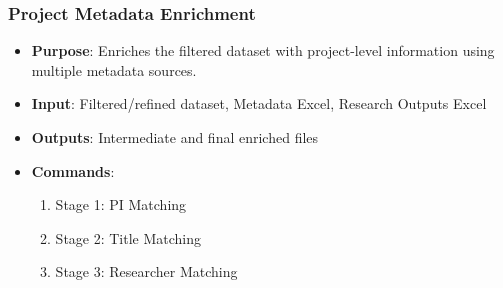 \documentclass[12pt]{article}
\begin{document}
\subsubsection{Project Metadata Enrichment}
\begin{itemize}
    \item \textbf{Purpose}: Enriches the filtered dataset with project-level information using multiple metadata sources.
    \item \textbf{Input}: Filtered/refined dataset, Metadata Excel, Research Outputs Excel
    \item \textbf{Outputs}: Intermediate and final enriched files
    \item \textbf{Commands}:
    \begin{enumerate}
        \item Stage 1: PI Matching
        \item Stage 2: Title Matching
        \item Stage 3: Researcher Matching
    \end{enumerate}
\end{itemize}
\end{document}
